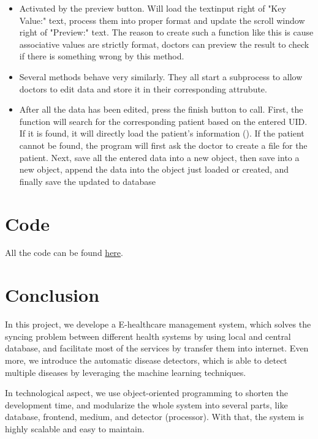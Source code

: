 \documentclass{article}
\begin{document}
\begin{itemize}
  \item {} Activated by the preview button. Will load the textinput right of "Key Value:" text, process them into proper format and update the scroll window right of "Preview:" text. The reason to create such a function like this is cause associative values are strictly format, doctors can preview the result to check if there is something wrong by this method.
  \item {} Several methods behave very similarly. They all start a subprocess to allow doctors to edit data and store it in their corresponding attrubute.
  \item {} After all the data has been edited, press the finish button to call. First, the function will search for the corresponding patient based on the entered UID. If it is found, it will directly load the patient's information (). If the patient cannot be found, the program will first ask the doctor to create a file for the patient. Next, save all the entered data into a new  object, then save  into a new  object, append the data into the  object just loaded or created, and finally save the updated  to database
\end{itemize}

\section{Code}
\label{sec:code}
All the code can be found \href{https://github.com/OEmiliatanO/E-health}{here}.

\section{Conclusion}
\label{sec:conclusion}
In this project, we develope a E-healthcare management system, which solves 
the syncing problem between different health systems by using local and 
central database, and facilitate most of the services by transfer them into 
internet. Even more, we introduce the automatic disease detectors, which 
is able to detect multiple diseases by leveraging the machine learning 
techniques. 

In technological aspect, we use object-oriented programming to shorten the 
development time, and modularize the whole system into several parts, like 
database, frontend, medium, and detector (processor). With that, the system 
is highly scalable and easy to maintain. 
\end{document}
